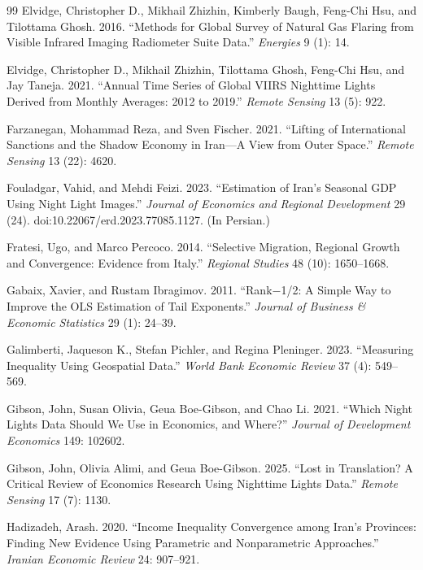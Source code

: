 \documentclass[11pt,a4paper]{article}
\begin{document}
\begin{thebibliography}{99}
Elvidge, Christopher D., Mikhail Zhizhin, Kimberly Baugh, Feng-Chi Hsu, and Tilottama Ghosh. 2016. ``Methods for Global Survey of Natural Gas Flaring from Visible Infrared Imaging Radiometer Suite Data.'' \textit{Energies} 9 (1): 14.

Elvidge, Christopher D., Mikhail Zhizhin, Tilottama Ghosh, Feng-Chi Hsu, and Jay Taneja. 2021. ``Annual Time Series of Global VIIRS Nighttime Lights Derived from Monthly Averages: 2012 to 2019.'' \textit{Remote Sensing} 13 (5): 922.

Farzanegan, Mohammad Reza, and Sven Fischer. 2021. ``Lifting of International Sanctions and the Shadow Economy in Iran---A View from Outer Space.'' \textit{Remote Sensing} 13 (22): 4620.

Fouladgar, Vahid, and Mehdi Feizi. 2023. ``Estimation of Iran's Seasonal GDP Using Night Light Images.'' \textit{Journal of Economics and Regional Development} 29 (24). doi:10.22067/erd.2023.77085.1127. (In Persian.)

Fratesi, Ugo, and Marco Percoco. 2014. ``Selective Migration, Regional Growth and Convergence: Evidence from Italy.'' \textit{Regional Studies} 48 (10): 1650--1668.

Gabaix, Xavier, and Rustam Ibragimov. 2011. ``Rank$-$1/2: A Simple Way to Improve the OLS Estimation of Tail Exponents.'' \textit{Journal of Business \& Economic Statistics} 29 (1): 24--39.

Galimberti, Jaqueson K., Stefan Pichler, and Regina Pleninger. 2023. ``Measuring Inequality Using Geospatial Data.'' \textit{World Bank Economic Review} 37 (4): 549--569.

Gibson, John, Susan Olivia, Geua Boe-Gibson, and Chao Li. 2021. ``Which Night Lights Data Should We Use in Economics, and Where?'' \textit{Journal of Development Economics} 149: 102602.

Gibson, John, Olivia Alimi, and Geua Boe-Gibson. 2025. ``Lost in Translation? A Critical Review of Economics Research Using Nighttime Lights Data.'' \textit{Remote Sensing} 17 (7): 1130.

Hadizadeh, Arash. 2020. ``Income Inequality Convergence among Iran's Provinces: Finding New Evidence Using Parametric and Nonparametric Approaches.'' \textit{Iranian Economic Review} 24: 907--921.


\end{thebibliography}
\end{document}
